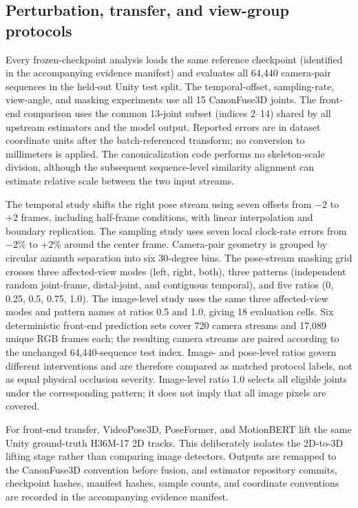 \documentclass[11pt,letterpaper]{article}
\begin{document}
\subsection{Perturbation, transfer, and view-group protocols}


Every frozen-checkpoint analysis loads the same reference checkpoint (identified in the accompanying evidence manifest) and evaluates all 64,440 camera-pair sequences in the held-out Unity test split. The temporal-offset, sampling-rate, view-angle, and masking experiments use all 15 CanonFuse3D joints. The front-end comparison uses the common 13-joint subset (indices 2--14) shared by all upstream estimators and the model output. Reported errors are in dataset coordinate units after the batch-referenced transform; no conversion to millimeters is applied. The canonicalization code performs no skeleton-scale division, although the subsequent sequence-level similarity alignment can estimate relative scale between the two input streams.

The temporal study shifts the right pose stream using seven offsets from \(-2\) to \(+2\) frames, including half-frame conditions, with linear interpolation and boundary replication. The sampling study uses seven local clock-rate errors from \(-2\%\) to \(+2\%\) around the center frame. Camera-pair geometry is grouped by circular azimuth separation into six 30-degree bins. The pose-stream masking grid crosses three affected-view modes (left, right, both), three patterns (independent random joint-frame, distal-joint, and contiguous temporal), and five ratios (0, 0.25, 0.5, 0.75, 1.0). The image-level study uses the same three affected-view modes and pattern names at ratios 0.5 and 1.0, giving 18 evaluation cells. Six deterministic front-end prediction sets cover 720 camera streams and 17,089 unique RGB frames each; the resulting camera streams are paired according to the unchanged 64,440-sequence test index. Image- and pose-level ratios govern different interventions and are therefore compared as matched protocol labels, not as equal physical occlusion severity. Image-level ratio 1.0 selects all eligible joints under the corresponding pattern; it does not imply that all image pixels are covered.

For front-end transfer, VideoPose3D, PoseFormer, and MotionBERT lift the same Unity ground-truth H36M-17 2D tracks. This deliberately isolates the 2D-to-3D lifting stage rather than comparing image detectors. Outputs are remapped to the CanonFuse3D convention before fusion, and estimator repository commits, checkpoint hashes, manifest hashes, sample counts, and coordinate conventions are recorded in the accompanying evidence manifest.
\end{document}
